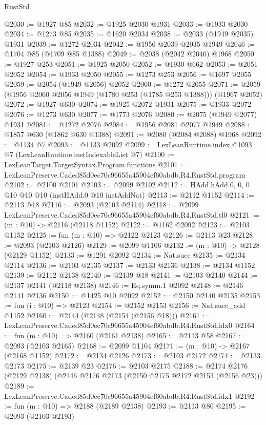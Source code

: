 \begin{lexlean}{RustStd}
\begin{coremodule}
@2030 := @1927 @85
@2032 := @1925 @2030 @1931
@2033 := @1933 @2030
@2034 := @1273 @85
@2035 := @1620 @2034
@2038 := @2033 (@1949 @2035) @1931
@2039 := @1272 @2034
@2042 := @1956 @2039 @2035 @1949
@2046 := @1704 @85 (@1709 @85 @1388)
@2049 := @2038 (@2042 @2046) @1968
@2050 := @1927 @253
@2051 := @1925 @2050
@2052 := @1930 @662
@2053 := @2051 @2052
@2054 := @1933 @2050
@2055 := @1273 @253
@2056 := @1697 @2055
@2059 := @2054 (@1949 @2056) @2052
@2060 := @1272 @2055
@2071 := @2059 (@1956 @2060 @2056 @1949 (@1780 @253 (@1785 @253 @1388))) (@1967 @2052)
@2072 := @1927 @630
@2074 := @1925 @2072 @1931
@2075 := @1933 @2072
@2076 := @1273 @630
@2077 := @1773 @2076
@2080 := @2075 (@1949 @2077) @1931
@2081 := @1272 @2076
@2084 := @1956 @2081 @2077 @1949
@2088 := @1857 @630 (@1862 @630 @1388)
@2091 := @2080 (@2084 @2088) @1968
@2092 := @1134 @7
@2093 := @1133 @2092
@2099 := LexLeanRuntime.index @1093 @7 (LexLeanRuntime.instIndexableList @7)
@2100 := LexLeanTarget.TargetSyntax.Program.functions
@2101 := LexLeanPreserve.Caded85d0ec70c96655a45904ef60abdb.R4.RustStd.program
@2102 := @2100 @2101
@2103 := @2099 @2102
@2112 := HAdd.hAdd.{0, 0, 0} @10 @10 @10 (instHAdd.{0} @10 instAddNat)
@2113 := @2112 @1152
@2114 := @2113 @18
@2116 := @2093 (@2103 @2114)
@2118 := @2099 LexLeanPreserve.Caded85d0ec70c96655a45904ef60abdb.R4.RustStd.tl0
@2121 := (m : @10) -> @2116 (@2118 @1152)
@2122 := @1162 @2092
@2123 := @2103 @1152
@2125 := fun (m : @10) => @2122 @2123
@2126 := @2113 @23
@2128 := @2093 (@2103 @2126)
@2129 := @2099 @1106
@2132 := (m : @10) -> @2128 (@2129 @1152)
@2133 := @1291 @2092
@2134 := Nat.succ
@2135 := @2134 @2114
@2136 := @2103 @2135
@2137 := @2133 @2136
@2138 := @2134 @1152
@2139 := @2112 @2138
@2140 := @2139 @18
@2141 := @2103 @2140
@2144 := @2137 @2141 (@2118 @2138)
@2146 := Eq.symm.{1} @2092
@2148 := @2146 @2141 @2136
@2150 := @1425 @10 @2092
@2152 := @2150 @2140 @2135
@2153 := fun (i : @10) => @2123
@2154 := @2152 @2153
@2156 := Nat.succ_add @1152
@2160 := @2144 (@2148 (@2154 (@2156 @18)))
@2161 := LexLeanPreserve.Caded85d0ec70c96655a45904ef60abdb.R4.RustStd.idx0
@2164 := fun (m : @10) => @2160 (@2161 @2138)
@2165 := @2113 @58
@2167 := @2093 (@2103 @2165)
@2168 := @2099 @1104
@2171 := (m : @10) -> @2167 (@2168 @1152)
@2172 := @2134 @2126
@2173 := @2103 @2172
@2174 := @2133 @2173
@2175 := @2139 @23
@2176 := @2103 @2175
@2188 := @2174 @2176 (@2129 @2138) (@2146 @2176 @2173 (@2150 @2175 @2172 @2153 (@2156 @23)))
@2189 := LexLeanPreserve.Caded85d0ec70c96655a45904ef60abdb.R4.RustStd.idx1
@2192 := fun (m : @10) => @2188 (@2189 @2138)
@2193 := @2113 @80
@2195 := @2093 (@2103 @2193)

\end{coremodule}
\end{lexlean}
